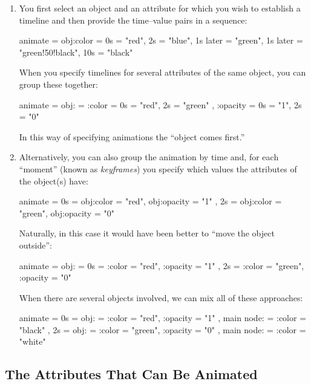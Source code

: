 \begin{enumerate}
\item You first select an object and an attribute for which you wish
  to establish a timeline and then provide the time--value pairs in a
  sequence:
\begin{codeexample}
animate = {    
  obj:color = {
    0s = "red",
    2s = "blue",
    1s later = "green",
    1s later = "green!50!black",
    10s = "black"
  }
}
\end{codeexample}
  When you specify timelines for several attributes of the same
  object, you can group these together:
\begin{codeexample}
animate = {    
  obj: = {
    :color = { 0s = "red", 2s = "green" },
    :opacity = { 0s = "1", 2s = "0" }
  }
}
\end{codeexample}
  In this way of specifying animations the ``object comes first.''
\item
  Alternatively, you can also group the animation by time and, for
  each ``moment'' (known as \emph{keyframes}) you specify which values
  the attributes of the object(s) have:
\begin{codeexample}
animate = {    
  0s = {
    obj:color = "red",
    obj:opacity = "1"
  },
  2s = {
    obj:color = "green",
    obj:opacity = "0" 
  }
}
\end{codeexample}
  Naturally, in this case it would have been better to ``move the
  object outside'': 
\begin{codeexample}
animate = {
  obj: = {
    0s = {
      :color = "red",
      :opacity = "1"
    },
    2s = {
      :color = "green",
      :opacity = "0" 
    }
  }
}
\end{codeexample}
  When there are several objects involved, we can mix all of these
  approaches: 
\begin{codeexample}
animate = {    
  0s = {
    obj: = {
      :color = "red",
      :opacity = "1"
    },
    main node: = {
      :color = "black"
    }
  },
  2s = {
    obj: = {
      :color = "green",
      :opacity = "0"
    },
    main node: = {
      :color = "white"
    }
  }
}
\end{codeexample}
\end{enumerate}




\subsection{The Attributes That Can Be Animated}

